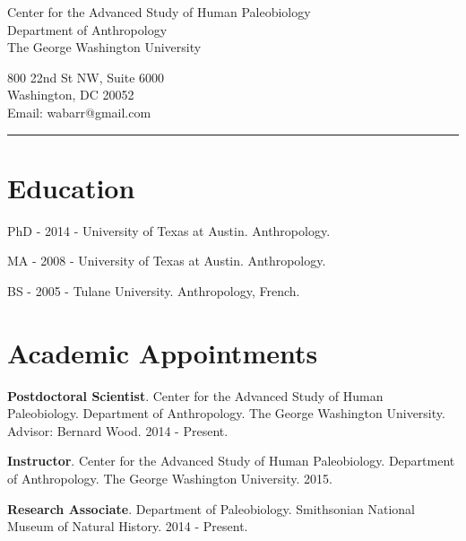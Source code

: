 \documentclass{article}
\begin{document}
\begin{center}
\end{center}

\vspace{15pt}

\noindent\begin{minipage}{.60\textwidth}
\begin{flushleft}
Center for the Advanced Study of Human Paleobiology\\
Department of Anthropology\\
The George Washington University\\
\end{flushleft}
\end{minipage}
\begin{minipage}{.395\textwidth}
\begin{flushright}
800 22nd St NW, Suite 6000\\
Washington, DC 20052 \\
Email: wabarr@gmail.com\\
\end{flushright}
\end{minipage}


\noindent\rule[-2mm]{\textwidth}{1pt}

\section*{Education}
\begin{description*}
\item[] PhD - 2014 - University of Texas at Austin. Anthropology.
\item[] MA  - 2008 - University of Texas at Austin. Anthropology.
\item[] BS  - 2005 - Tulane University. Anthropology, French.
\end{description*}


\section*{Academic Appointments}
\begin{description*}
\item[] {\bfseries Postdoctoral Scientist}. Center for the Advanced Study of Human Paleobiology. Department of Anthropology. The George Washington University. Advisor: Bernard Wood. 2014 - Present.
\item[] {\bfseries Instructor}. Center for the Advanced Study of Human Paleobiology. Department of Anthropology. The George Washington University. 2015.
\item[] {\bfseries Research Associate}. Department of Paleobiology.  Smithsonian National Museum of Natural History. 2014 - Present.
\end{description*}
\end{document}
